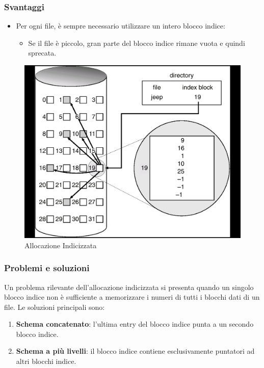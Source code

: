 \subsubsection{Svantaggi}
\begin{itemize}
    \item Per ogni file, è sempre necessario utilizzare un intero blocco indice:
          \begin{itemize}
              \item Se il file è piccolo, gran parte del blocco indice rimane vuota e quindi sprecata.
          \end{itemize}
\end{itemize}

\begin{figure}[h] \centering \includegraphics[width=0.50\linewidth]{images/allocazione_indiciz.png} \caption{Allocazione Indicizzata} \label{fig:14.4} \end{figure}

\subsubsection{Problemi e soluzioni}
Un problema rilevante dell’allocazione indicizzata si presenta quando un singolo blocco indice non è sufficiente a memorizzare i numeri di tutti i blocchi dati di un file.  
Le soluzioni principali sono:
\begin{enumerate}
    \item \textbf{Schema concatenato}: l’ultima entry del blocco indice punta a un secondo blocco indice.
    \item \textbf{Schema a più livelli}: il blocco indice contiene esclusivamente puntatori ad altri blocchi indice.
\end{enumerate}

